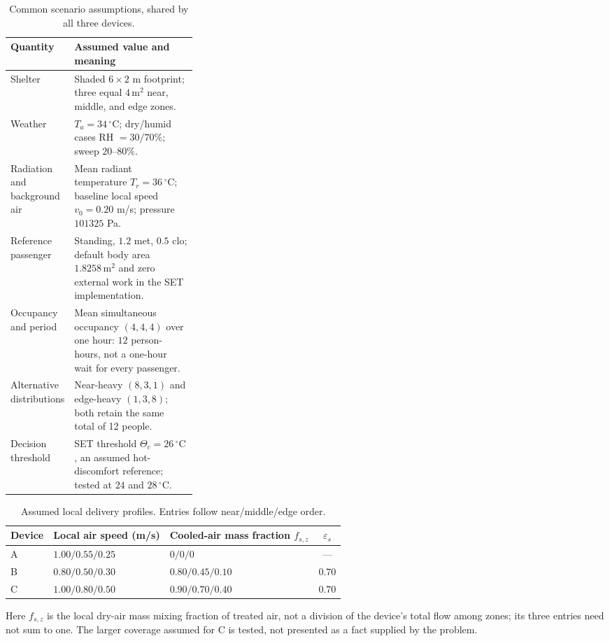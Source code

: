 \documentclass[12pt]{article}
\begin{document}
\begin{table}[!ht]
\centering\small
\caption{Common scenario assumptions, shared by all three devices.}
\label{tab:bus-assumptions}
\renewcommand{\arraystretch}{1.12}
\begin{tabularx}{\linewidth}{@{}p{0.31\linewidth}X@{}}
\toprule
Quantity & Assumed value and meaning\\
\midrule
Shelter & Shaded $6\times2$ m footprint; three equal $4\,\mathrm{m^2}$ near, middle, and edge zones.\\
Weather & $T_a=34\,^{\circ}\mathrm C$; dry/humid cases RH $=30/70\%$; sweep $20$--$80\%$.\\
Radiation and background air & Mean radiant temperature $T_r=36\,^{\circ}\mathrm C$; baseline local speed $v_0=0.20$ m/s; pressure $101325$ Pa.\\
Reference passenger & Standing, $1.2$ met, $0.5$ clo; default body area $1.8258\,\mathrm{m^2}$ and zero external work in the SET implementation.\\
Occupancy and period & Mean simultaneous occupancy $(4,4,4)$ over one hour: $12$ person-hours, not a one-hour wait for every passenger.\\
Alternative distributions & Near-heavy $(8,3,1)$ and edge-heavy $(1,3,8)$; both retain the same total of 12 people.\\
Decision threshold & SET threshold $\Theta_c=26\,^{\circ}\mathrm C$, an assumed hot-discomfort reference; tested at $24$ and $28\,^{\circ}\mathrm C$.\\
\bottomrule
\end{tabularx}
\end{table}

\begin{table}[!ht]
\centering\small
\caption{Assumed local delivery profiles. Entries follow near/middle/edge order.}
\label{tab:bus-fields}
\begin{tabularx}{\linewidth}{@{}lXXc@{}}
\toprule
Device & Local air speed (m/s) & Cooled-air mass fraction $f_{s,z}$ & $\varepsilon_s$\\
\midrule
A & $1.00 / 0.55 / 0.25$ & $0 / 0 / 0$ & ---\\
B & $0.80 / 0.50 / 0.30$ & $0.80 / 0.45 / 0.10$ & $0.70$\\
C & $1.00 / 0.80 / 0.50$ & $0.90 / 0.70 / 0.40$ & $0.70$\\
\bottomrule
\end{tabularx}
\end{table}

Here $f_{s,z}$ is the local dry-air mass mixing fraction of treated air, not a division of the device's total flow among zones; its three entries need not sum to one. The larger coverage assumed for C is tested, not presented as a fact supplied by the problem.
\end{document}
